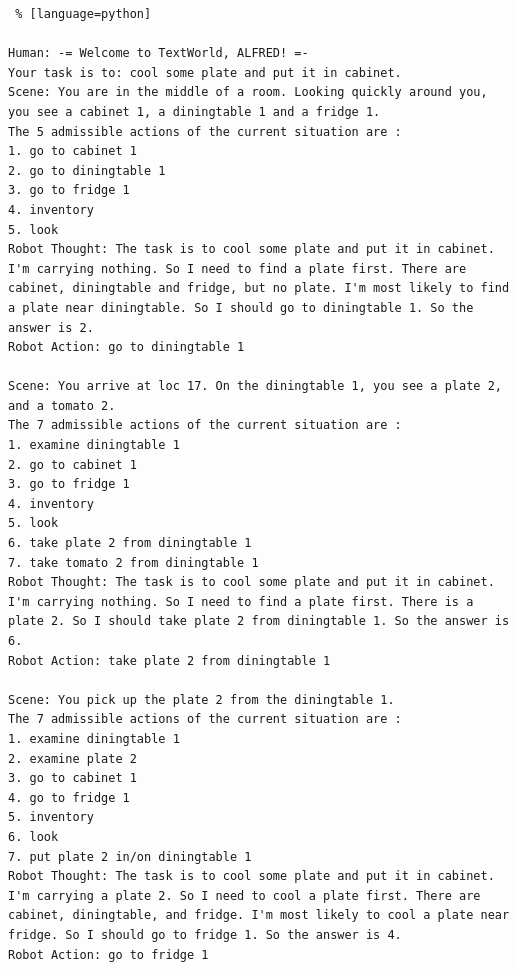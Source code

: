 \begin{lstlisting} % [language=python]  

Human: -= Welcome to TextWorld, ALFRED! =-
Your task is to: cool some plate and put it in cabinet.
Scene: You are in the middle of a room. Looking quickly around you, you see a cabinet 1, a diningtable 1 and a fridge 1.
The 5 admissible actions of the current situation are :
1. go to cabinet 1
2. go to diningtable 1
3. go to fridge 1
4. inventory
5. look
Robot Thought: The task is to cool some plate and put it in cabinet. I'm carrying nothing. So I need to find a plate first. There are cabinet, diningtable and fridge, but no plate. I'm most likely to find a plate near diningtable. So I should go to diningtable 1. So the answer is 2.
Robot Action: go to diningtable 1

Scene: You arrive at loc 17. On the diningtable 1, you see a plate 2, and a tomato 2.
The 7 admissible actions of the current situation are :
1. examine diningtable 1
2. go to cabinet 1
3. go to fridge 1
4. inventory
5. look
6. take plate 2 from diningtable 1
7. take tomato 2 from diningtable 1
Robot Thought: The task is to cool some plate and put it in cabinet. I'm carrying nothing. So I need to find a plate first. There is a plate 2. So I should take plate 2 from diningtable 1. So the answer is 6.
Robot Action: take plate 2 from diningtable 1

Scene: You pick up the plate 2 from the diningtable 1.
The 7 admissible actions of the current situation are :
1. examine diningtable 1
2. examine plate 2
3. go to cabinet 1
4. go to fridge 1
5. inventory
6. look
7. put plate 2 in/on diningtable 1
Robot Thought: The task is to cool some plate and put it in cabinet. I'm carrying a plate 2. So I need to cool a plate first. There are cabinet, diningtable, and fridge. I'm most likely to cool a plate near fridge. So I should go to fridge 1. So the answer is 4.
Robot Action: go to fridge 1


\end{lstlisting}

